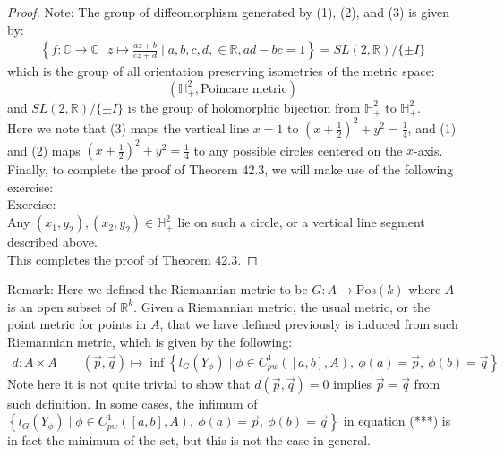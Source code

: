 \documentclass[15pt]{book}
\theoremstyle{break}
\theoremstyle{break}
\newcommand{\R}{\mathbb{R}}
\newcommand{\Complex}{\mathbb{C}}
\newcommand{\note}{\color{red}Note: \color{black}}
\newcommand{\remark}{\color{blue}Remark: \color{black}}
\newcommand{\exercise}{\color{green}Exercise: \color{black}}
\begin{document}
\begin{proof}
\note The group of diffeomorphism generated by (1), (2), and (3) is given by:
\begin{align*}
\left\{f:\Complex \to \Complex \ \ \ z\mapsto \frac{az+b}{cz+d} \mid a,b,c,d,\in \R , ad-bc = 1\right\} = SL(2,\R) / \{\pm I\}
\end{align*}
which is the group of all orientation preserving isometries of the metric space: 
$$(\mathbb{H}_+^2, \text{Poincare metric})$$ 
and $SL(2,\R) / \{\pm I\}$ is the group of holomorphic bijection from $\mathbb{H}_+^2$ to $\mathbb{H}_+^2$.\\

Here we note that (3) maps the vertical line $x=1$ to $(x+\frac{1}{2})^2 + y^2 = \frac{1}{4}$, and (1) and (2) maps $(x+\frac{1}{2})^2 + y^2 = \frac{1}{4}$ to any possible circles centered on the $x$-axis.\\

Finally, to complete the proof of Theorem 42.3, we will make use of the following exercise:\\

\exercise \\
Any $(x_1,y_2),(x_2,y_2) \in \mathbb{H}_+^2$ lie on such a circle, or a vertical line segment described above. \\

This completes the proof of Theorem 42.3.
\end{proof}


\hfill\break
\hfill\break
\remark Here we defined the Riemannian metric to be $G:A \to \text{Pos}(k)$ where $A$ is an open subset of $\R^k$. Given a Riemannian metric, the usual metric, or the point metric for points in $A$, that we have defined previously is induced from such Riemannian metric, which is given by the following:
\begin{align*}
d:A \times A \qquad (\vec{p},\vec{q}) \mapsto \inf \left\{l_G(Y_{\phi}) \mid \phi \in C_{pw}^1([a,b],A),\ \phi(a) = \vec{p}, \ \phi(b) = \vec{q}\right\} \tag{***}
\end{align*}
Note here it is not quite trivial to show that $d(\vec{p},\vec{q}) = 0$ implies $\vec{p} = \vec{q}$ from such definition. In some cases, the infimum of $\left\{l_G(Y_{\phi}) \mid \phi \in C_{pw}^1([a,b],A),\ \phi(a) = \vec{p}, \ \phi(b) = \vec{q}\right\} $ in equation (***) is in fact the minimum of the set, but this is not the case in general. \\
\end{document}
